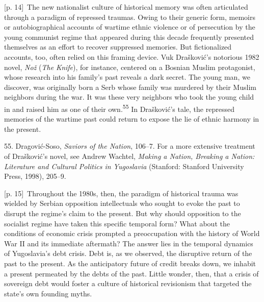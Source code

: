 \documentclass[10pt,a4paper]{article}
\begin{document}
{\scriptsize\color{gray} [p. 14]}\ The new nationalist culture of historical memory was often articulated through a paradigm of repressed traumas. Owing to their generic form, memoirs or autobiographical accounts of wartime ethnic violence or of persecution by the young communist regime that appeared during this decade frequently presented themselves as an effort to recover suppressed memories. But fictionalized accounts, too, often relied on this framing device. Vuk Drašković’s notorious 1982 novel, \textit{Nož} (\textit{The Knife}), for instance, centered on a Bosnian Muslim protagonist, whose research into his family’s past reveals a dark secret. The young man, we discover, was originally born a Serb whose family was murdered by their Muslim neighbors during the war. It was these very neighbors who took the young child in and raised him as one of their own.\nobreak\textsuperscript{55} In Drašković’s tale, the repressed memories of the wartime past could return to expose the lie of ethnic harmony in the present.\par{\small 55. Dragović-Soso, \textit{Saviors of the Nation}, 106–7. For a more extensive treatment of Drašković’s novel, see Andrew Wachtel, \textit{Making a Nation, Breaking a Nation: Literature and Cultural Politics in Yugoslavia} (Stanford: Stanford University Press, 1998), 205–9.\par}
{\scriptsize\color{gray} [p. 15]}\ Throughout the 1980s, then, the paradigm of historical trauma was wielded by Serbian opposition intellectuals who sought to evoke the past to disrupt the regime’s claim to the present. But why should opposition to the socialist regime have taken this specific temporal form? What about the conditions of economic crisis prompted a preoccupation with the history of World War II and its immediate aftermath? The answer lies in the temporal dynamics of Yugoslavia’s debt crisis. Debt is, as we observed, the disruptive return of the past to the present. As the anticipatory future of credit breaks down, we inhabit a present permeated by the debts of the past. Little wonder, then, that a crisis of sovereign debt would foster a culture of historical revisionism that targeted the state’s own founding myths.\par
\end{document}
